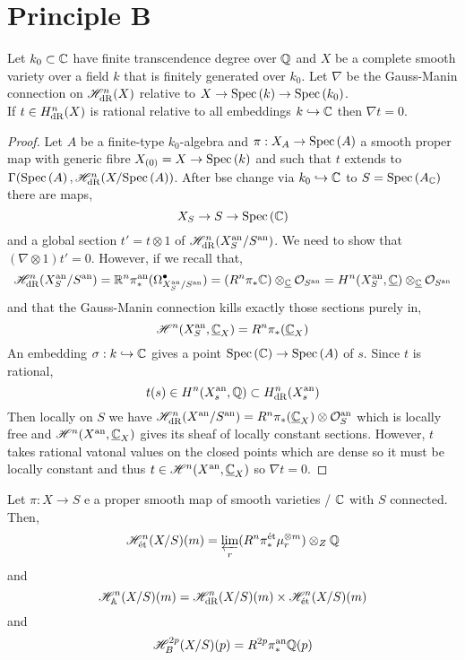 \documentclass[12pt]{article}
\begin{document}
\section{Principle B}

\newcommand{\fin}{\mathrm{fin}}

\begin{proposition}
Let $k_0 \subset \mathbb{C}$ have finite transcendence degree over $\mathbb{Q}$ and $X$ be a complete smooth variety over a field $k$ that is finitely generated over $k_0$. Let $\nabla$ be the Gauss-Manin connection on $\mathscr{H}^n_{\mathrm{dR}}(X)$ relative to $X \to \mathrm{Spec}\left( k \right) \to \mathrm{Spec}\left( k_0 \right)$.
\bigskip\\
If $t \in H^n_{\mathrm{dR}}(X)$ is rational relative to all embeddings $k \hookrightarrow  \mathbb{C}$ then $\nabla t = 0$. 
\end{proposition}

\begin{proof}
Let $A$ be a finite-type $k_0$-algebra and $\pi : X_A \to \mathrm{Spec}\left( A \right)$ a smooth proper map with generic fibre $X_{(0)} = X \to \mathrm{Spec}\left( k \right)$ and such that $t$ extends to $\Gamma(\mathrm{Spec}\left( A \right), \mathscr{H}^n_{\mathrm{dR}}(X / \mathrm{Spec}\left( A \right))$. After bse change via $k_0 \hookrightarrow \mathbb{C}$ to $S = \mathrm{Spec}\left( A_{\mathbb{C}} \right)$ there are maps,
\[ X_S \to S \to \mathrm{Spec}\left( \mathbb{C} \right) \]
and a global section $t' = t \otimes 1$ of $\mathscr{H}^n_{\mathrm{dR}}(X_S^{\mathrm{an}} / S^{\mathrm{an}})$. We need to show that $(\nabla \otimes 1) t' = 0$. However, if we recall that,
\[ \mathscr{H}^n_{\mathrm{dR}}(X_S^{\mathrm{an}} / S^{\mathrm{an}}) = \mathbb{R}^n \pi_*^{\mathrm{an}} (\Omega^\bullet_{X_S^{\mathrm{an}} / S^{\mathrm{an}}}) = (R^n \pi_* \mathbb{C}) \otimes_{\underline{\mathbb{C}}} \mathcal{O}_{S^{\mathrm{an}}} = H^n(X^{\mathrm{an}}_S, \underline{\mathbb{C}}) \otimes_{\underline{\mathbb{C}}} \mathcal{O}_{S^{\mathrm{an}}} \]
and that the Gauss-Manin connection kills exactly those sections purely in,
\[ \mathscr{H}^n(X^{\mathrm{an}}_S, \underline{\mathbb{C}}_X) = R^n \pi_* (\underline{\mathbb{C}}_X) \]
An embedding $\sigma : k \hookrightarrow \mathbb{C}$ gives a point $\mathrm{Spec}\left( \mathbb{C} \right) \to \mathrm{Spec}\left( A \right)$ of $s$. Since $t$ is rational,
\[ t(s) \in H^n(X^{\mathrm{an}}_s, \mathbb{Q}) \subset H^n_{\mathrm{dR}}(X^{\mathrm{an}}_s) \]
Then locally on $S$ we have $\mathscr{H}^n_{\mathrm{dR}}(X^{\mathrm{an}} / S^{\mathrm{an}}) = R^n \pi_*(\underline{\mathbb{C}}_X) \otimes \mathcal{O}_{S}^{\mathrm{an}}$ which is locally free and $\mathscr{H}^n(X^{\mathrm{an}}, \underline{\mathbb{C}}_X)$ gives its sheaf of locally constant sections. However, $t$ takes rational vatonal values on the closed points which are dense so it must be locally constant and thus $t \in \mathscr{H}^n(X^{\mathrm{an}}, \underline{\mathbb{C}}_X)$ so $\nabla t = 0$.
\end{proof}

\begin{definition}
Let $\pi : X \to S$ e a proper smooth map of smooth varieties / $\mathbb{C}$ with $S$ connected. Then,
\[ \mathscr{H}^n_{\text{\'{e}t}}(X/S)(m) = \varprojlim_r (R^n \pi^{\text{\'{e}t}}_* \mu_r^{\otimes m} ) \otimes_Z \mathbb{Q} \]
and
\[ \mathscr{H}^n_{\mathbb{A}}(X/S)(m) = \mathscr{H}^n_{\mathrm{dR}}(X/S)(m) \times \mathscr{H}^n_{\text{\'{e}t}}(X/S)(m) \]
and
\[ \mathscr{H}_B^{2 p}(X/S)(p) = R^{2p} \pi_*^{\mathrm{an}} \mathbb{Q}(p) \]
\end{definition}
\end{document}
